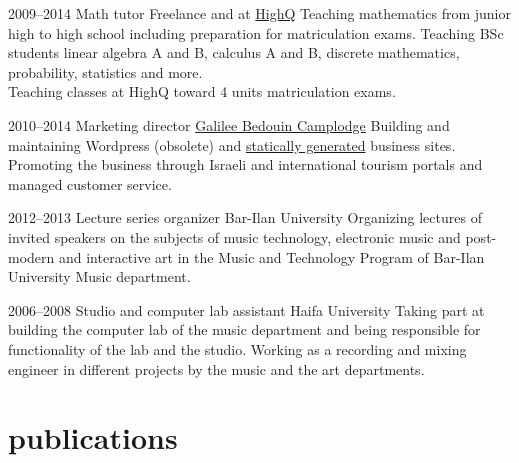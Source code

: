 \documentclass[]{friggeri-cv}  %
\begin{document}
\begin{entrylist}

    \entry
    {2009--2014}
    {Math tutor}
    {Freelance and at \href{http://high-q.co.il/}{HighQ}}
    {Teaching mathematics from junior high to high school including preparation for matriculation exams. Teaching BSc students linear algebra A and B, calculus A and B, discrete mathematics, probability, statistics and more.\\
    Teaching classes at HighQ toward 4 units matriculation exams.}

\end{entrylist}
\begin{entrylist}

    \entry
    {2010--2014}
    {Marketing director}
    {\href{http://www.galilee-bedouin-camplodge.com}{Galilee Bedouin Camplodge}}
    {Building and maintaining Wordpress (obsolete) and \href{http://www.galilee-bedouin-camplodge.com}{statically generated} business sites.
    Promoting the business through Israeli and international tourism portals and managed customer service.}

\end{entrylist}
\begin{entrylist}

    \entry
    {2012--2013}
    {Lecture series organizer}
    {Bar-Ilan University}
    {Organizing lectures of invited speakers on the subjects of music technology, electronic music and post-modern and interactive art in the Music and Technology Program of Bar-Ilan University Music department.}

\end{entrylist}
\begin{entrylist}

    \entry
    {2006--2008}
    {Studio and computer lab assistant}
    {Haifa University}
    {Taking part at building the computer lab of the music department and being responsible for functionality of the lab and the studio. Working as a recording and mixing engineer in different projects by the music and the art departments.}

\end{entrylist}


\section{publications}
\end{document}
